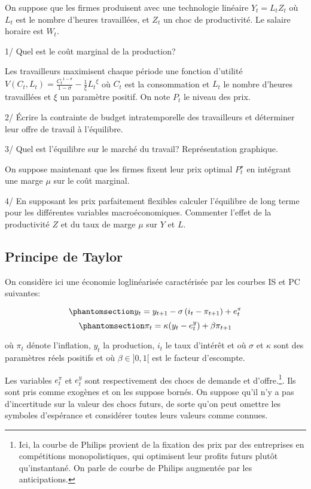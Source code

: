 \documentclass[
  letterpaper,
  DIV=11,
  numbers=noendperiod]{scrartcl}
\begin{document}
On suppose que les firmes produisent avec une technologie linéaire
\(Y_t = L_t Z_t\) où \(L_t\) est le nombre d'heures travaillées, et
\(Z_t\) un choc de productivité. Le salaire horaire est \(W_t\).

1/ Quel est le coût marginal de la production?

Les travailleurs maximisent chaque période une fonction d'utilité
\(V(C_t,L_t) = \frac{{C_t}^{1-\sigma}}{1-\sigma} - \frac{1}{\xi}{L_t}^{\xi}\)
où \(C_t\) est la consommation et \(L_t\) le nombre d'heures travaillées
et \(\xi\) un paramètre positif. On note \(P_t\) le niveau des prix.

2/ Écrire la contrainte de budget intratemporelle des travailleurs et
déterminer leur offre de travail à l'équilibre.

3/ Quel est l'équilibre sur le marché du travail? Représentation
graphique.

On suppose maintenant que les firmes fixent leur prix optimal
\(P^{\star}_t\) en intégrant une marge \(\mu\) sur le coût marginal.

4/ En supposant les prix parfaitement flexibles calculer l'équilibre de
long terme pour les différentes variables macroéconomiques. Commenter
l'effet de la productivité \(Z\) et du taux de marge \(\mu\) sur \(Y\)
et \(L\).

\subsection{Principe de Taylor}\label{principe-de-taylor}

On considère ici une économie loglinéarisée caractérisée par les courbes
IS et PC suivantes:

\begin{equation}\phantomsection\label{eq-is}{y_t = y_{t+1} - \sigma \left( i_t - \pi_{t+1} \right) + e^{\pi}_t}\end{equation}
\begin{equation}\phantomsection\label{eq-pc}{\pi_t = \kappa (y_t - e^y_t)  + \beta \pi_{t+1}}\end{equation}

où \(\pi_t\) dénote l'inflation, \(y_t\) la production, \(i_t\) le taux
d'intérêt et où \(\sigma\) et \(\kappa\) sont des paramètres réels
positifs et où \(\beta \in ]0,1[\) est le facteur d'escompte.

Les variables \(e^{\pi}_t\) et \(e^{y}_t\) sont respectivement des chocs
de demande et d'offre.\footnote{Ici, la courbe de Philips provient de la
  fixation des prix par des entreprises en compétitions monopolistiques,
  qui optimisent leur profits futurs plutôt qu'instantané. On parle de
  courbe de Philips augmentée par les anticipations.}. Ils sont pris
comme exogènes et on les suppose bornés. On suppose qu'il n'y a pas
d'incertitude sur la valeur des chocs futurs, de sorte qu'on peut
omettre les symboles d'espérance et considérer toutes leurs valeurs
comme connues.
\end{document}
